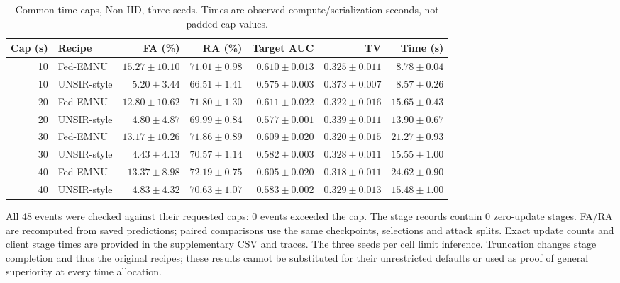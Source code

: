 \begin{table}[htbp]\centering\scriptsize\setlength{\tabcolsep}{4pt}
\caption{Common time caps, Non-IID, three seeds. Times are observed compute/serialization seconds, not padded cap values.}\label{tab:walltime-noniid}
\begin{tabular}{rlrrrrr}\toprule Cap (s) & Recipe & FA (\%) & RA (\%) & Target AUC & TV & Time (s)\\\midrule
10 & Fed-EMNU & $15.27 \pm 10.10$ & $71.01 \pm 0.98$ & $0.610 \pm 0.013$ & $0.325 \pm 0.011$ & $8.78 \pm 0.04$\\
10 & UNSIR-style & $5.20 \pm 3.44$ & $66.51 \pm 1.41$ & $0.575 \pm 0.003$ & $0.373 \pm 0.007$ & $8.57 \pm 0.26$\\
20 & Fed-EMNU & $12.80 \pm 10.62$ & $71.80 \pm 1.30$ & $0.611 \pm 0.022$ & $0.322 \pm 0.016$ & $15.65 \pm 0.43$\\
20 & UNSIR-style & $4.80 \pm 4.87$ & $69.99 \pm 0.84$ & $0.577 \pm 0.001$ & $0.339 \pm 0.011$ & $13.90 \pm 0.67$\\
30 & Fed-EMNU & $13.17 \pm 10.26$ & $71.86 \pm 0.89$ & $0.609 \pm 0.020$ & $0.320 \pm 0.015$ & $21.27 \pm 0.93$\\
30 & UNSIR-style & $4.43 \pm 4.13$ & $70.57 \pm 1.14$ & $0.582 \pm 0.003$ & $0.328 \pm 0.011$ & $15.55 \pm 1.00$\\
40 & Fed-EMNU & $13.37 \pm 8.98$ & $72.19 \pm 0.75$ & $0.605 \pm 0.020$ & $0.318 \pm 0.011$ & $24.62 \pm 0.90$\\
40 & UNSIR-style & $4.83 \pm 4.32$ & $70.63 \pm 1.07$ & $0.583 \pm 0.002$ & $0.329 \pm 0.013$ & $15.48 \pm 1.00$\\
\bottomrule\end{tabular}\end{table}
All 48 events were checked against their requested caps: 0
events exceeded the cap. The stage records contain 0 zero-update stages.
FA/RA are recomputed from saved predictions; paired comparisons use the
same checkpoints, selections and attack splits. Exact update counts and client
stage times are provided in the supplementary CSV and traces. The three seeds
per cell limit inference. Truncation changes stage completion and thus the
original recipes; these results cannot be substituted for their unrestricted
defaults or used as proof of general superiority at every time allocation.

